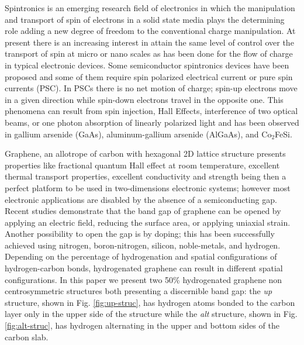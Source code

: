 \documentclass[prb,11pt,tightenlines,twocolumn,aps]{revtex4-1}
\begin{document}
{
\color{blue}
Spintronics is an emerging research field of electronics in which the
manipulation and transport of spin of electrons in a solid state 
media plays the determining role adding a new degree of freedom to the
conventional charge manipulation.\cite{wolfSC04,fabianAPS07}
% 
At present there is an increasing interest in attain the same level of control
over the transport of spin at micro or nano scales as has been done for the
flow of charge in typical electronic devices.\cite{awschalomNP2007} Some
semiconductor spintronics devices have been proposed \cite{majumdarAPL06,
dattaAPL90} and some of them require spin polarized electrical current
\cite{awschalomSSBM13} or pure spin currents (PSC). In PSCs there is no net
motion of charge; spin-up electrons move in a given direction while spin-down
electrons travel in the opposite one. This phenomena can result from spin
injection,\cite{malPRB03} Hall Effects,\cite{sinovaPRB04} interference of two
optical beams,\cite{bhatPRL00, najmaiePRB03} or one photon absorption of
linearly polarized light\cite{bhatPRL05} and has been observed in gallium
arsenide (GaAs),\cite{zhaoPRL2006, stevensPRL03} aluminum-gallium arsenide
(AlGaAs),\cite{stevensPRL03} and Co$_2$FeSi.\cite{kimuraNGPAM12}

% 
Graphene, an allotrope of carbon with hexagonal 2D lattice structure presents
properties like fractional quantum Hall effect at room temperature, excellent
thermal transport properties, excellent conductivity\cite{heerscheNat07} and
strength \cite{geimNM07, reinaNL08, novoselov2S07, balandinNL08} being then a
perfect platform to be used in two-dimensions electronic systems; however most
electronic applications are disabled by the absence of a semiconducting gap.
Recent studies demonstrate that the band gap of graphene can be opened by
applying an electric field,\cite{zhangN09} reducing the surface
area,\cite{hanPRL07} or applying uniaxial strain.\cite{niACSN08} Another
possibility to open the gap is by doping; this has been successfully achieved
using nitrogen,\cite{weiNL2009} boron-nitrogen,\cite{guoIJ11}
silicon,\cite{colettiPRB10} noble-metals, and hydrogen.\cite{eliasS09,
guisingerNL09, samarakoonACSN10}
% 
Depending on the percentage of hydrogenation and spatial configurations of
hydrogen-carbon bonds, hydrogenated graphene can result in different spatial
configurations.
% 
In this paper we present two 50\% hydrogenated graphene non centrosymmetric
structures both presenting a discernible band gap: the \emph{up} structure,
shown in Fig. \ref{fig:up-struc}, has hydrogen atoms bonded to the carbon layer
only in the upper side of the structure while the \emph{alt} structure, shown
in Fig. \ref{fig:alt-struc}, has hydrogen alternating in the upper and bottom
sides of the carbon slab.\cite{zapataPSB2016}

}
\end{document}
